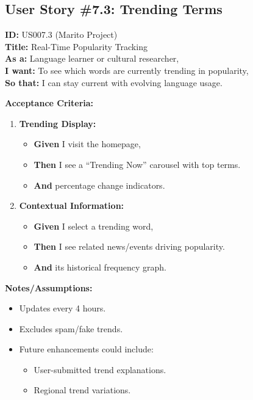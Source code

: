 \documentclass[12pt]{article}
\begin{document}
\subsection{User Story \#7.3: Trending Terms}

\textbf{ID:} US007.3 (Marito Project) \\
\textbf{Title:} Real-Time Popularity Tracking \\
\textbf{As a:} Language learner or cultural researcher, \\
\textbf{I want:} To see which words are currently trending in popularity, \\
\textbf{So that:} I can stay current with evolving language usage.

\vspace{1em}
\textbf{Acceptance Criteria:}
\begin{enumerate}
    \item \textbf{Trending Display:}
    \begin{itemize}
        \item \textbf{Given} I visit the homepage,
        \item \textbf{Then} I see a ``Trending Now'' carousel with top terms.
        \item \textbf{And} percentage change indicators.
    \end{itemize}

    \item \textbf{Contextual Information:}
    \begin{itemize}
        \item \textbf{Given} I select a trending word,
        \item \textbf{Then} I see related news/events driving popularity.
        \item \textbf{And} its historical frequency graph.
    \end{itemize}
\end{enumerate}

\vspace{1em}
\textbf{Notes/Assumptions:}
\begin{itemize}
    \item Updates every 4 hours.
    \item Excludes spam/fake trends.
    \item Future enhancements could include:
    \begin{itemize}
        \item User-submitted trend explanations.
        \item Regional trend variations.
    \end{itemize}
\end{itemize}
\end{document}
